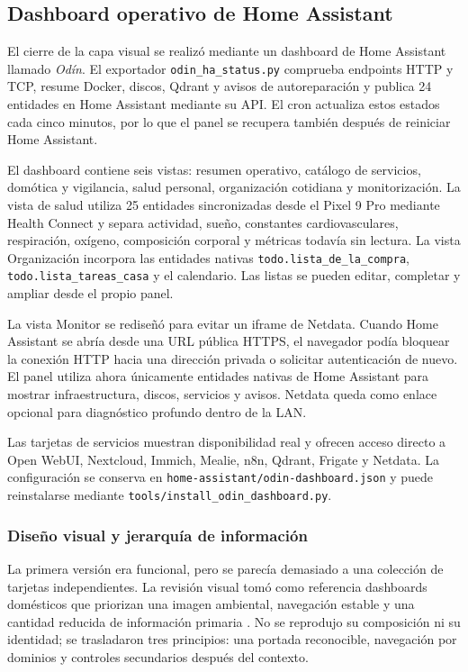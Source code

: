 \subsection{Dashboard operativo de Home Assistant}
El cierre de la capa visual se realizó mediante un dashboard de Home Assistant llamado \textit{Odín}. El exportador \texttt{odin\_ha\_status.py} comprueba endpoints HTTP y TCP, resume Docker, discos, Qdrant y avisos de autoreparación y publica 24 entidades en Home Assistant mediante su API. El cron actualiza estos estados cada cinco minutos, por lo que el panel se recupera también después de reiniciar Home Assistant.

El dashboard contiene seis vistas: resumen operativo, catálogo de servicios, domótica y vigilancia, salud personal, organización cotidiana y monitorización. La vista de salud utiliza 25 entidades sincronizadas desde el Pixel 9 Pro mediante Health Connect y separa actividad, sueño, constantes cardiovasculares, respiración, oxígeno, composición corporal y métricas todavía sin lectura. La vista Organización incorpora las entidades nativas \texttt{todo.lista\_de\_la\_compra}, \texttt{todo.lista\_tareas\_casa} y el calendario. Las listas se pueden editar, completar y ampliar desde el propio panel.

La vista Monitor se rediseñó para evitar un iframe de Netdata. Cuando Home Assistant se abría desde una URL pública HTTPS, el navegador podía bloquear la conexión HTTP hacia una dirección privada o solicitar autenticación de nuevo. El panel utiliza ahora únicamente entidades nativas de Home Assistant para mostrar infraestructura, discos, servicios y avisos. Netdata queda como enlace opcional para diagnóstico profundo dentro de la LAN.

Las tarjetas de servicios muestran disponibilidad real y ofrecen acceso directo a Open WebUI, Nextcloud, Immich, Mealie, n8n, Qdrant, Frigate y Netdata. La configuración se conserva en \nolinkurl{home-assistant/odin-dashboard.json} y puede reinstalarse mediante \nolinkurl{tools/install_odin_dashboard.py}.

\subsubsection{Diseño visual y jerarquía de información}
La primera versión era funcional, pero se parecía demasiado a una colección de tarjetas independientes. La revisión visual tomó como referencia dashboards domésticos que priorizan una imagen ambiental, navegación estable y una cantidad reducida de información primaria \citep{redditWifeApprovedDashboardV2}. No se reprodujo su composición ni su identidad; se trasladaron tres principios: una portada reconocible, navegación por dominios y controles secundarios después del contexto.


